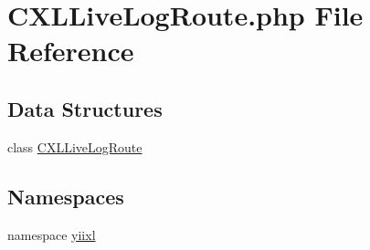\hypertarget{CXLLiveLogRoute_8php}{
\section{CXLLiveLogRoute.php File Reference}
\label{CXLLiveLogRoute_8php}
}
\subsection*{Data Structures}
\begin{DoxyCompactItemize}
\item 
class \hyperlink{classCXLLiveLogRoute}{CXLLiveLogRoute}
\end{DoxyCompactItemize}
\subsection*{Namespaces}
\begin{DoxyCompactItemize}
\item 
namespace \hyperlink{namespaceyiixl}{yiixl}
\end{DoxyCompactItemize}
